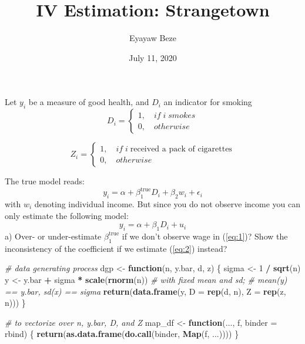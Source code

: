 \documentclass[
]{article}
\title{IV Estimation: Strangetown}
\author{Eyayaw Beze}
\date{July 11, 2020}
\newenvironment{Shaded}{\begin{snugshade}}{\end{snugshade}}
\newcommand{\CommentTok}[1]{\textcolor[rgb]{0.56,0.35,0.01}{\textit{#1}}}
\newcommand{\ControlFlowTok}[1]{\textcolor[rgb]{0.13,0.29,0.53}{\textbf{#1}}}
\newcommand{\DataTypeTok}[1]{\textcolor[rgb]{0.13,0.29,0.53}{#1}}
\newcommand{\DecValTok}[1]{\textcolor[rgb]{0.00,0.00,0.81}{#1}}
\newcommand{\KeywordTok}[1]{\textcolor[rgb]{0.13,0.29,0.53}{\textbf{#1}}}
\newcommand{\NormalTok}[1]{#1}
\newcommand{\OperatorTok}[1]{\textcolor[rgb]{0.81,0.36,0.00}{\textbf{#1}}}
\newcommand{\StringTok}[1]{\textcolor[rgb]{0.31,0.60,0.02}{#1}}
\begin{document}
\maketitle

Let \(y_i\) be a measure of good health, and \(D_i\) an indicator for
smoking \[ D_i = \left\{
 \begin{array}{lr}
 1, \quad if \;i \; smokes\\
 0, \quad otherwise
 \end{array}
 \right.
 \]

\[ Z_i = \left\{
 \begin{array}{lr}
 1, \quad if \;i \; \text{received a pack of cigarettes}\\
 0, \quad otherwise
 \end{array}
 \right.
 \]

The true model reads: \begin{equation}
 y_{i}=\alpha+\beta_{1}^{\text {true}} D_{i}+\beta_{2} w_{i}+\epsilon_{i}\label{eq:1}
 \end{equation} with \(w_{i}\) denoting individual income. But since you
do not observe income you can only estimate the following model:
\begin{equation}
 y_{i}=\alpha+\beta_{1} D_{i}+u_{i}\label{eq:2}
 \end{equation} a) Over- or under-estimate \(\beta_{1}^{\text {true}}\)
if we don't observe wage in (\ref{eq:1})? Show the inconsistency of the
coefficient if we estimate (\ref{eq:2}) instead?

\begin{Shaded}
\begin{Highlighting}[]
\CommentTok{\# data generating process}
\NormalTok{dgp \textless{}{-}}\StringTok{ }\ControlFlowTok{function}\NormalTok{(n, y.bar, d, z) \{}
\NormalTok{  sigma \textless{}{-}}\StringTok{ }\DecValTok{1} \OperatorTok{/}\StringTok{ }\KeywordTok{sqrt}\NormalTok{(n)}
\NormalTok{  y \textless{}{-}}\StringTok{ }\NormalTok{y.bar }\OperatorTok{+}\StringTok{ }\NormalTok{sigma }\OperatorTok{*}\StringTok{ }\KeywordTok{scale}\NormalTok{(}\KeywordTok{rnorm}\NormalTok{(n)) }\CommentTok{\# with fixed mean and sd; }
                                       \CommentTok{\# mean(y) == y.bar, sd(x) == sigma}
  \KeywordTok{return}\NormalTok{(}\KeywordTok{data.frame}\NormalTok{(y, }\DataTypeTok{D =} \KeywordTok{rep}\NormalTok{(d, n), }\DataTypeTok{Z =} \KeywordTok{rep}\NormalTok{(z, n)))}
\NormalTok{\}}

\CommentTok{\# to vectorize over n, y.bar, D, and Z}
\NormalTok{map\_df \textless{}{-}}\StringTok{ }\ControlFlowTok{function}\NormalTok{(..., f, }\DataTypeTok{binder =}\NormalTok{ rbind) \{}
  \KeywordTok{return}\NormalTok{(}\KeywordTok{as.data.frame}\NormalTok{(}\KeywordTok{do.call}\NormalTok{(binder, }\KeywordTok{Map}\NormalTok{(f, ...))))}
\NormalTok{\}}
\end{Highlighting}
\end{Shaded}
\end{document}
